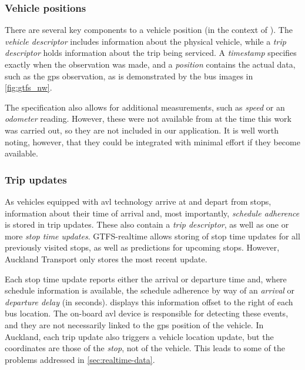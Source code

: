 \subsubsection{Vehicle positions}
\label{sec:gtfs_rt_vehicle}

There are several key components to a vehicle position (in the context of \GTFS{}). The \emph{vehicle descriptor} includes information about the physical vehicle, while a \emph{trip descriptor} holds information about the trip being serviced. A \emph{timestamp} specifies exactly when the observation was made, and a \emph{position} contains the actual data, such as the \gls{gps} observation, as is demonstrated by the bus images in \cref{fig:gtfs_nw}.


The specification also allows for additional measurements, such as \emph{speed} or an \emph{odometer} reading. However, these were not available from \AT{} at the time this work was carried out, so they are not included in our application. It is well worth noting, however, that they could be integrated with minimal effort if they become available.


\subsubsection{Trip updates}
\label{sec:gtfs_rt_trip}

As vehicles equipped with \gls{avl} technology arrive at and depart from stops, information about their time of arrival and, most importantly, \emph{schedule adherence} is stored in trip updates. These also contain a \emph{trip descriptor}, as well as one or more \emph{stop time updates}. GTFS-realtime allows storing of stop time updates for all previously visited stops, as well as predictions for upcoming stops. However, Auckland Transport only stores the most recent update.


Each stop time update reports either the arrival or departure time and, where schedule information is available, the schedule adherence by way of an \emph{arrival} or \emph{departure delay} (in seconds).  displays this information offset to the right of each bus location. The on-board \gls{avl} device is responsible for detecting these events, and they are not necessarily linked to the \gls{gps} position of the vehicle. In Auckland, each trip update also triggers a vehicle location update, but the coordinates are those of the \emph{stop}, not of the vehicle. This leads to some of the problems addressed in \cref{sec:realtime-data}.


